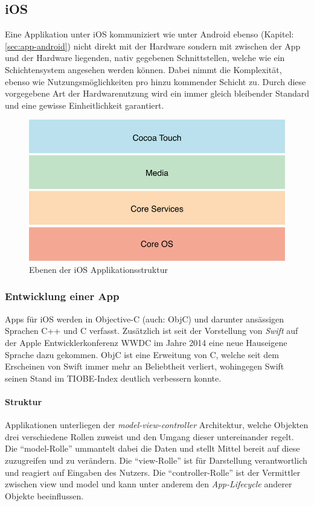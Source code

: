 \subsection{iOS}
	Eine Applikation unter iOS kommuniziert wie unter Android ebenso (Kapitel:
	\ref{sec:app-android}) nicht direkt mit der Hardware sondern mit zwischen der
	App und der Hardware liegenden, nativ gegebenen Schnittstellen, welche wie ein
	Schichtensystem angesehen werden können. Dabei nimmt die Komplexität, ebenso wie
	Nutzungsmöglichkeiten pro hinzu kommender Schicht zu. Durch diese vorgegebene
	Art der Hardwarenutzung wird ein immer gleich bleibender Standard und eine
	gewisse Einheitlichkeit garantiert.
	\begin{figure}[h]
		\centering
		\includegraphics[width=0.5\linewidth]{ios/media/ios-layers.png}
		\caption{Ebenen der iOS Applikationsstruktur}
		\label{fig:marcetshare}
	\end{figure}
	
	\subsubsection{Entwicklung einer App}
		Apps für iOS werden in Objective-C (auch: ObjC) und darunter ansässigen
		Sprachen C++ und C verfasst. Zusätzlich ist seit der Vorstellung von
		\textsl{Swift} auf der Apple Entwicklerkonferenz WWDC im Jahre 2014 eine
		neue Hauseigene Sprache dazu gekommen. ObjC ist eine Erweitung von C, welche
		seit dem Erscheinen von Swift immer mehr an Beliebtheit verliert, wohingegen
		Swift seinen Stand im TIOBE-Index deutlich verbessern konnte.
		\paragraph{Struktur}
			Applikationen unterliegen der \textsl{model-view-controller} Architektur,
			welche Objekten drei verschiedene Rollen zuweist und den Umgang dieser
			untereinander regelt. Die "`model-Rolle"' ummantelt dabei die Daten und stellt
			Mittel bereit auf diese zuzugreifen und zu verändern. Die "`view-Rolle"' ist
			für Darstellung verantwortlich und reagiert auf Eingaben des Nutzers. Die
			"`controller-Rolle"' ist der Vermittler zwischen view und model und kann
			unter anderem den \textsl{App-Lifecycle} anderer Objekte beeinflussen.
